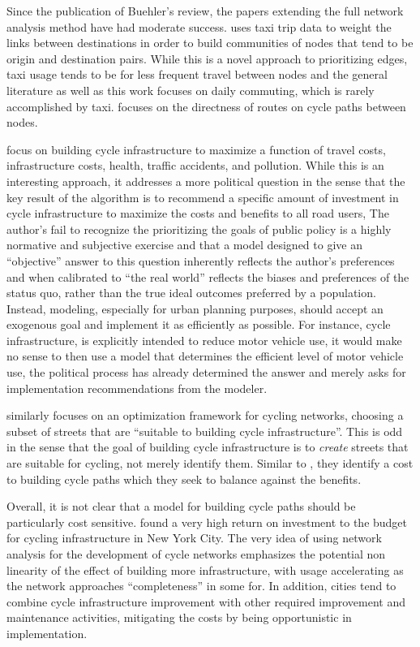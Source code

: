 Since the publication of Buehler's review, the papers extending the full network analysis method have had moderate success. \cite{akbarzadeh2018designing} uses taxi trip data to weight the links between destinations in order to build communities of nodes that tend to be origin and destination pairs. While this is a novel approach to prioritizing edges, taxi usage tends to be for less frequent travel between nodes and the general literature as well as this work focuses on daily commuting, which is rarely accomplished by taxi. \cite{boisjoly2019bicycle} focuses on the directness of routes on cycle paths between nodes. 

\cite{doorley2019designing} focus on building cycle infrastructure to maximize a function of travel costs, infrastructure costs, health, traffic accidents, and pollution. While this is an interesting approach, it addresses a more political question in the sense that the key result of the algorithm is to recommend a specific amount of investment in cycle infrastructure to maximize the costs and benefits to all road users, The author's fail to recognize the prioritizing the goals of public policy is a highly normative and subjective exercise and that a model designed to give an ``objective'' answer to this question inherently reflects the author's preferences and when calibrated to ``the real world'' reflects the biases and preferences of the status quo, rather than the true ideal outcomes preferred by a population. Instead, modeling, especially for urban planning purposes, should accept an exogenous goal and implement it as efficiently as possible. For instance, cycle infrastructure, is explicitly intended to reduce motor vehicle use, it would make no sense to then use a model that determines the efficient level of motor vehicle use, the political process has already determined the answer and merely asks for implementation recommendations from the modeler. 

\cite{mauttone2017bicycle} similarly focuses on an optimization framework for cycling networks, choosing a subset of streets that are ``suitable to building cycle infrastructure''. This is odd in the sense that the goal of building cycle infrastructure is to \textit{create} streets that are suitable for cycling, not merely identify them. Similar to \cite{doorley2019designing}, they identify a cost to building cycle paths which they seek to balance against the benefits. 

Overall, it is not clear that a model for building cycle paths should be particularly cost sensitive. \cite{gu2017cost} found a very high return on investment to the budget for cycling infrastructure in New York City. The very idea of using network analysis for the development of cycle networks emphasizes the potential non linearity of the effect of building more infrastructure, with usage accelerating as the network approaches ``completeness'' in some for. In addition, cities tend to combine cycle infrastructure improvement with other required improvement and maintenance activities, mitigating the costs by being opportunistic in implementation. 


